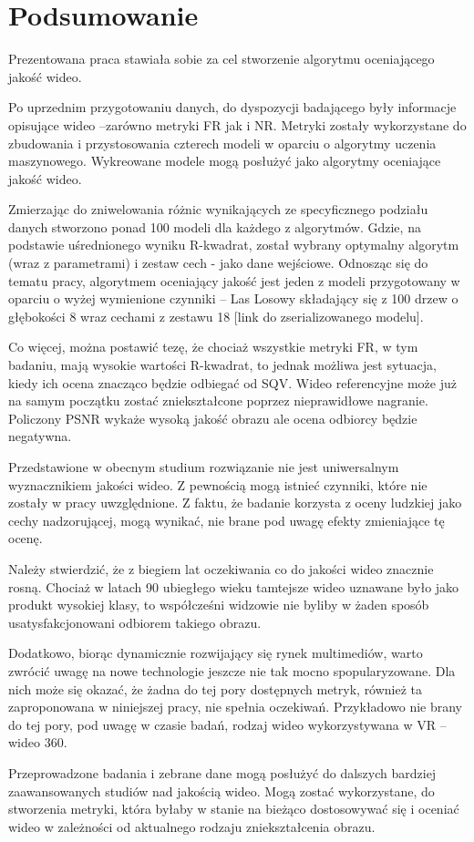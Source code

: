 \chapter{Podsumowanie}


Prezentowana praca stawiała sobie za cel stworzenie algorytmu oceniającego jakość wideo.

Po uprzednim przygotowaniu danych, do dyspozycji badającego były informacje opisujące wideo –zarówno metryki FR jak i NR. Metryki zostały wykorzystane do zbudowania i przystosowania czterech modeli w oparciu o algorytmy uczenia maszynowego. Wykreowane modele mogą posłużyć jako algorytmy oceniające jakość wideo.

Zmierzając do zniwelowania różnic wynikających ze specyficznego podziału danych stworzono ponad 100 modeli dla każdego z algorytmów. Gdzie, na podstawie uśrednionego wyniku R-kwadrat, został wybrany optymalny algorytm (wraz z parametrami) i zestaw cech - jako dane wejściowe. Odnosząc się do tematu pracy, algorytmem oceniający jakość jest jeden z modeli przygotowany w oparciu o wyżej wymienione czynniki -- Las Losowy składający się z 100 drzew o głębokości 8 wraz cechami z zestawu 18 [link do zserializowanego modelu].

Co więcej, można postawić tezę, że chociaż wszystkie metryki FR, w tym badaniu, mają wysokie wartości R-kwadrat, to jednak możliwa jest sytuacja, kiedy ich ocena znacząco będzie odbiegać od SQV. Wideo referencyjne może już na samym początku zostać zniekształcone poprzez nieprawidłowe nagranie. Policzony PSNR wykaże wysoką jakość obrazu ale ocena odbiorcy będzie negatywna.

Przedstawione w obecnym studium rozwiązanie nie jest uniwersalnym wyznacznikiem jakości wideo. Z pewnością mogą istnieć czynniki, które nie zostały w pracy uwzględnione. Z faktu, że badanie korzysta z oceny ludzkiej jako cechy nadzorującej, mogą wynikać, nie brane pod uwagę efekty zmieniające tę ocenę.

Należy stwierdzić, że z biegiem lat oczekiwania co do jakości wideo znacznie rosną. Chociaż w latach 90 ubiegłego wieku tamtejsze wideo uznawane było jako produkt wysokiej klasy, to współcześni widzowie nie byliby w żaden sposób usatysfakcjonowani odbiorem takiego obrazu. 

Dodatkowo, biorąc dynamicznie rozwijający się rynek multimediów, warto zwrócić uwagę na nowe technologie jeszcze nie tak mocno spopularyzowane. Dla nich może się okazać, że żadna do tej pory dostępnych metryk, również ta  zaproponowana w niniejszej pracy,  nie spełnia oczekiwań. Przykładowo nie brany do tej pory, pod uwagę w czasie badań, rodzaj wideo wykorzystywana w VR -- wideo 360.  

Przeprowadzone badania i zebrane dane mogą posłużyć do dalszych bardziej
zaawansowanych studiów nad jakością wideo. Mogą zostać wykorzystane, do stworzenia metryki, która byłaby w stanie na bieżąco dostosowywać się i oceniać wideo w zależności od aktualnego rodzaju zniekształcenia obrazu.


\label{cha:pierwszyDokument}









